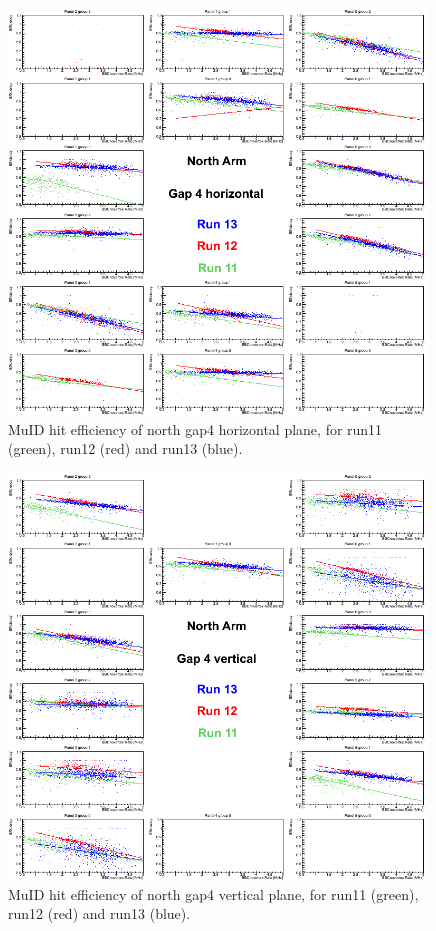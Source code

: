 \begin{figure}[h!]

  \centering
  \includegraphics[width=0.99\textwidth]{./figures/efficomp_North_gap4_horizontal.png}
  \caption{\label{Fig:efficiency:MuIdEff:a1g4p0}MuID hit efficiency of north gap4 horizontal plane, for run11 (green), run12 (red) and run13 (blue).}
\end{figure}
\clearpage


\begin{figure}[h!]

  \centering
  \includegraphics[width=0.99\textwidth]{./figures/efficomp_North_gap4_vertical.png}
  \caption{\label{Fig:efficiency:MuIdEff:a1g4p1}MuID hit efficiency of north gap4 vertical plane, for run11 (green), run12 (red) and run13 (blue).}
  \label{fig:muid_last}
\end{figure}
\clearpage

